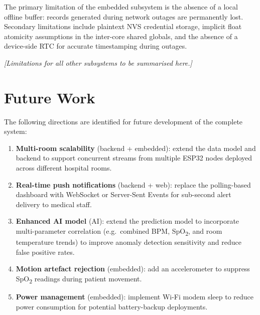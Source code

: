 The primary limitation of the embedded subsystem is the absence of a local offline
buffer: records generated during network outages are permanently lost.
Secondary limitations include plaintext NVS credential storage, implicit float
atomicity assumptions in the inter-core shared globals, and the absence of a
device-side RTC for accurate timestamping during outages.

\begin{center}
	\textit{[Limitations for all other subsystems to be summarised here.]}
\end{center}

\section{Future Work}

The following directions are identified for future development of the complete system:

\begin{enumerate}
	\item \textbf{Multi-room scalability} (backend + embedded): extend the data
	      model and backend to support concurrent streams from multiple ESP32 nodes
	      deployed across different hospital rooms.

	\item \textbf{Real-time push notifications} (backend + web): replace the
	      polling-based dashboard with WebSocket or Server-Sent Events for sub-second
	      alert delivery to medical staff.

	\item \textbf{Enhanced AI model} (AI): extend the prediction model to
	      incorporate multi-parameter correlation (e.g.\ combined BPM, SpO\textsubscript{2},
	      and room temperature trends) to improve anomaly detection sensitivity and
	      reduce false positive rates.

	\item \textbf{Motion artefact rejection} (embedded): add an accelerometer to
	      suppress SpO\textsubscript{2} readings during patient movement.

	\item \textbf{Power management} (embedded): implement Wi-Fi modem sleep to
	      reduce power consumption for potential battery-backup deployments.
\end{enumerate}
